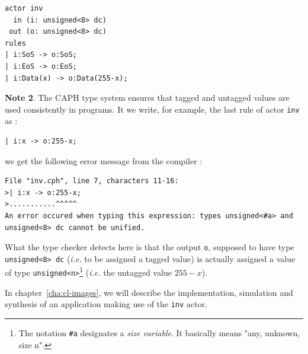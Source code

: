 \begin{lstlisting}[style=CaphStyle,caption={An actor computing image negatives in
    CAPH (alternate syntax)},label={lst:inv-actor2}]
actor inv
  in (i: unsigned<8> dc)
 out (o: unsigned<8> dc)
rules
| i:SoS -> o:SoS;
| i:EoS -> o:EoS;
| i:Data(x) -> o:Data(255-x);
\end{lstlisting}

\medskip
\textbf{Note 2}. The CAPH type system ensures that tagged and untagged values are used consistently
in programs. It we write, for example, the last rule of actor \verb|inv| as :

\begin{lstlisting}[style=CaphStyle]
| i:x -> o:255-x;
\end{lstlisting}

we get the following error message from the compiler :

\begin{lstlisting}[style=BashOutputStyle]
File "inv.cph", line 7, characters 11-16:
>| i:x -> o:255-x;
>...........^^^^^
An error occured when typing this expression: types unsigned<#a> and unsigned<8> dc cannot be unified.
\end{lstlisting}

What the type checker detects here is that the output \verb|o|, supposed to have type
\verb|unsigned<8> dc| (\emph{i.e.} to be assigned a tagged value) is actually assigned a value of
type \verb|unsigned<n>|\footnote{The notation \texttt{\#a} designates a \emph{size variable}. It
  basically means "any, unknown, size n".} (\emph{i.e.} the untagged value $255-x$). 

\bigskip
In chapter~\ref{cha:cl-images}, we will describe the implementation, simulation and synthesis of an
application making use of the \verb|inv| actor.



